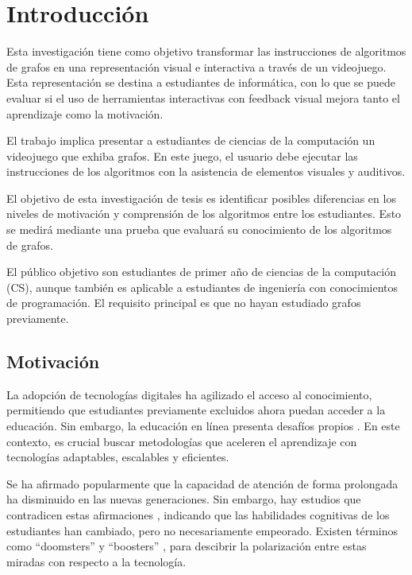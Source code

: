 \chapter{Introducción}

Esta investigación tiene como objetivo transformar las instrucciones de algoritmos de grafos en una representación visual e interactiva a través de un videojuego. Esta representación se destina a estudiantes de informática, con lo que se puede evaluar si el uso de herramientas interactivas con feedback visual mejora tanto el aprendizaje como la motivación.

El trabajo implica presentar a estudiantes de ciencias de la computación un videojuego que exhiba grafos. En este juego, el usuario debe ejecutar las instrucciones de los algoritmos con la asistencia de elementos visuales y auditivos.

El objetivo de esta investigación de tesis es identificar posibles diferencias en los niveles de motivación y comprensión de los algoritmos entre los estudiantes. Esto se medirá mediante una prueba que evaluará su conocimiento de los algoritmos de grafos.

El público objetivo son estudiantes de primer año de ciencias de la computación (CS), aunque también es aplicable a estudiantes de ingeniería con conocimientos de programación. El requisito principal es que no hayan estudiado grafos previamente.

\section{Motivación}

La adopción de tecnologías digitales ha agilizado el acceso al conocimiento, permitiendo que estudiantes previamente excluidos ahora puedan acceder a la educación. Sin embargo, la educación en línea presenta desafíos propios \cite{UN2023ImpactDigitalTechnologies}. En este contexto, es crucial buscar metodologías que aceleren el aprendizaje con tecnologías adaptables, escalables y eficientes.

Se ha afirmado popularmente que la capacidad de atención de forma prolongada ha disminuido en las nuevas generaciones. Sin embargo, hay estudios que contradicen estas afirmaciones \cite{The_Role_of_Attention_Learning_Digital_Age}, indicando que las habilidades cognitivas de los estudiantes han cambiado, pero no necesariamente empeorado. Existen términos como ``doomsters'' y ``boosters'' \cite{Selwyn2014LookingF}, para descibrir la polarización entre estas miradas con respecto a la tecnología.

